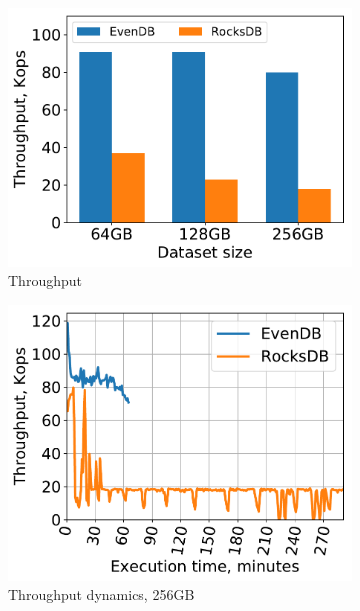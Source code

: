 \begin{figure}[tb]
\centering
\begin{subfigure}{0.33\linewidth}
\includegraphics[width=\textwidth]{figs/ingestion.pdf}
\caption{Throughput}
\label{fig:prod:ingestion:a}
\end{subfigure}
\begin{subfigure}{0.33\linewidth}
\includegraphics[width=\textwidth]{figs/throughput_256_line.pdf}
\caption{Throughput dynamics, 256GB}
\label{fig:prod:ingestion:b}
\end{subfigure}
\begin{subfigure}{0.33\linewidth}

\end{subfigure}
\end{figure}
